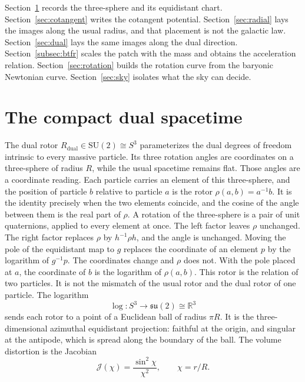 \documentclass[a4paper]{article}
\begin{document}
Section~\ref{sec:compact} records the three-sphere and its equidistant chart. Section~\ref{sec:cotangent} writes the cotangent potential. Section~\ref{sec:radial} lays the images along the usual radius, and that placement is not the galactic law. Section~\ref{sec:dual} lays the same images along the dual direction. Section~\ref{subsec:btfr} scales the patch with the mass and obtains the acceleration relation. Section~\ref{sec:rotation} builds the rotation curve from the baryonic Newtonian curve. Section~\ref{sec:sky} isolates what the sky can decide.

\section{The compact dual spacetime}
\label{sec:compact}

The dual rotor $R_{\text{dual}} \in \mathrm{SU}(2) \cong S^3$ parameterizes the dual degrees of freedom intrinsic to every massive particle. Its three rotation angles are coordinates on a three-sphere of radius $R$, while the usual spacetime remains flat. Those angles are a coordinate reading. Each particle carries an element of this three-sphere, and the position of particle $b$ relative to particle $a$ is the rotor $\rho(a,b)=a^{-1}b$. It is the identity precisely when the two elements coincide, and the cosine of the angle between them is the real part of $\rho$. A rotation of the three-sphere is a pair of unit quaternions, applied to every element at once. The left factor leaves $\rho$ unchanged. The right factor replaces $\rho$ by $h^{-1}\rho h$, and the angle is unchanged. Moving the pole of the equidistant map to $g$ replaces the coordinate of an element $p$ by the logarithm of $g^{-1}p$. The coordinates change and $\rho$ does not. With the pole placed at $a$, the coordinate of $b$ is the logarithm of $\rho(a,b)$. This rotor is the relation of two particles. It is not the mismatch of the usual rotor and the dual rotor of one particle. The logarithm
\[
\log : S^3 \to \mathfrak{su}(2) \cong \mathbb{R}^3
\]
sends each rotor to a point of a Euclidean ball of radius $\pi R$. It is the three-dimensional azimuthal equidistant projection: faithful at the origin, and singular at the antipode, which is spread along the boundary of the ball. The volume distortion is the Jacobian
\[
\mathcal{J}(\chi) = \frac{\sin^2 \chi}{\chi^2}, \qquad \chi = r/R.
\]
\end{document}
